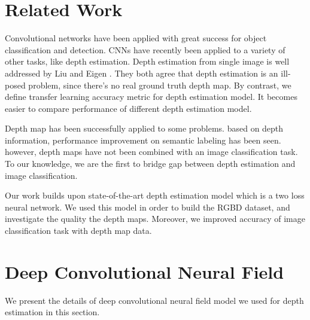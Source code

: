 \documentclass[10pt,twocolumn,letterpaper]{article}
\begin{document}
\section{Related Work}
Convolutional networks have been applied with great success for object 
classification and detection. CNNs have recently been applied to a variety 
of other tasks, like depth estimation. Depth estimation from single image is 
well addressed by Liu\etal\cite{liu2015deep} and Eigen\etal 
\cite{eigen2015predicting}. They both agree that depth estimation 
is an ill-posed problem, since there's no real ground truth depth map. By 
contrast, we define transfer learning accuracy metric for depth estimation 
model. It becomes easier to compare performance of different depth estimation 
model.

Depth map has been successfully applied to some problems. based on depth 
information, performance improvement on semantic 
labeling\cite{eigen2015predicting} has been seen. however, depth maps have not
been combined with an image classification task. To our knowledge, we are the first to 
bridge gap between depth estimation and image classification.

Our work builds upon state-of-the-art depth estimation model\cite{liu2015deep}
which is a two loss neural network. We used this model in order to build the RGBD dataset, and investigate the
quality the depth maps. Moreover, we improved 
accuracy of image classification task with depth map data.

\section{Deep Convolutional Neural Field}
We present the details of deep convolutional neural field model we used for 
depth estimation in this section. 
\end{document}
